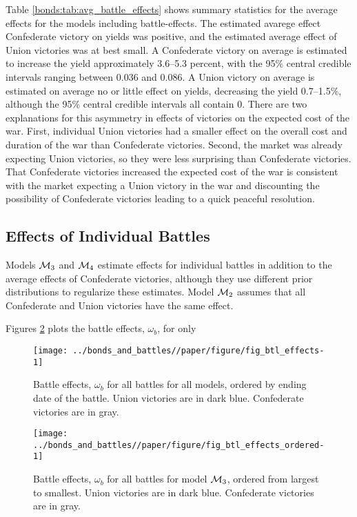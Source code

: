 Table \ref{bonds:tab:avg_battle_effects} shows summary statistics for the average effects for the models including battle-effects.
The estimated avarege effect Confederate victory on yields was positive, and the estimated average effect of Union victories was at best small.
A Confederate victory on average is estimated to increase the yield approximately 3.6--5.3 percent, with the 95\% central credible intervals ranging between 0.036 and 0.086.
A Union victory on average is estimated on average no or little effect on yields, decreasing the yield 0.7--1.5\%, although the 95\% central credible intervals all contain 0.
There are two explanations for this asymmetry in effects of victories on the expected cost of the war.
First, individual Union victories had a smaller effect on the overall cost and duration of the war than Confederate victories.
Second, the market was already expecting Union victories, so they were less surprising than Confederate victories.
That Confederate victories increased the expected cost of the war is consistent with the market expecting a Union victory in the war and discounting the possibility of Confederate victories leading to a quick peaceful resolution.



\subsection{Effects of Individual Battles}
\label{sec:indiv-effects-battl}


Models $\Model{3}$ and $\mathcal{M}_{\text{4}}$ estimate effects for individual battles in addition to the average effects of Confederate victories, although they use different prior distributions to regularize these estimates.
Model $\mathcal{M}_{\text{2}}$ assumes that all Confederate and Union victories have the same effect.

Figures \ref{bonds:fig:btl_effects_ordered} plots the battle effects, $\omega_{b}$, for only 

\begin{figure}[!htpb]
  \centering
  \texttt{[image: ../bonds\_and\_battles//paper/figure/fig\_btl\_effects-1]}
  \caption[Battle Effects on log-yields for all models]{Battle effects, $\omega_{b}$ for all battles for all models, ordered by ending date of the battle.
    Union victories are in dark blue. Confederate victories are in gray.
  }
  \label{bonds:fig:btl_effects}
\end{figure}


\begin{figure}[!htpb]
  \centering
  \texttt{[image: ../bonds\_and\_battles//paper/figure/fig\_btl\_effects\_ordered-1]}  
  \caption[Battle Effects on log-yields for model $\Model{3}$]{
    Battle effects, $\omega_{b}$ for all battles for model $\Model{3}$, ordered from largest to smallest.
    Union victories are in dark blue. Confederate victories are in gray.
  }
  \label{bonds:fig:btl_effects_ordered}
\end{figure}



